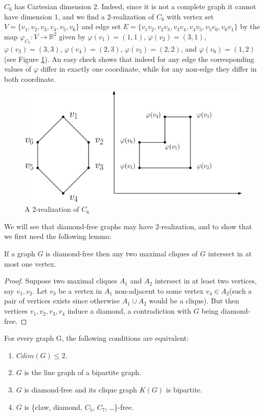 \documentclass[12pt,a4paper,titlepage,openany]{report}
\begin{document}
\begin{example}
$C_6$ has Cartesian dimension $2$. Indeed, since it is not a complete graph it cannot have dimension $1$, and we find a $2$-realization of $C_6$ with vertex set $V=\{v_1,v_2,v_3,v_4,v_5,v_6\}$ and edge set $E=\{v_1v_2,v_2v_3,v_3v_4,v_4v_5,v_5v_6,v_6v_1\}$ by the map $\varphi_{C_7}:V\to \mathbb{R}^2$ given by $\varphi(v_1)=(1,1)$, $\varphi(v_2)=(3,1)$, $\varphi(v_3)=(3,3)$, $\varphi(v_4)=(2,3)$, $\varphi(v_5)=(2,2)$, and $\varphi(v_6)=(1,2)$ (see Figure \ref{c_62real}). An easy check shows that indeed for any edge the corresponding values of $\varphi$ differ in exactly one coordinate, while for any non-edge they differ in both coordinate.
\begin{figure}[h]
\begin{center}
\includegraphics[width=1\linewidth]{figures/c_62real.png}
\end{center}
\caption{A $2$-realization of $C_6$}\label{c_62real}
\end{figure}
\end{example} 
We will see that diamond-free graphs may have $2$-realization, and to show that we first need the following lemma:  
\begin{lemma}\label{diamondfreecliques}
If a graph $G$ is diamond-free then any two maximal cliques of $G$ intersect in at most one vertex.
\end{lemma}
\begin{proof}
Suppose two maximal cliques $A_1$ and $A_2$ intersect in at least two vertices, say $v_1, v_2$. Let $v_3$ be a vertex in $A_1$ non-adjacent to some vertex $v_4\in A_2$(such a pair of vertices exists since otherwise $A_1\cup A_2$ would be a clique). But then vertices $v_1,v_2,v_3,v_4$ induce a diamond, a contradiction with $G$ being diamond-free.
\end{proof}

\begin{theorem}
For every graph G, the following conditions are equivalent:
\begin{enumerate}
\item $Cdim(G)\leq 2$.
\item $G$ is the line graph of a bipartite graph.
\item $G$ is diamond-free and its clique graph $K(G)$ is bipartite.
\item $G$ is \{claw, diamond, $C_5$, $C_7$, \ldots\}-free.
\end{enumerate}
\end{theorem}
\end{document}
